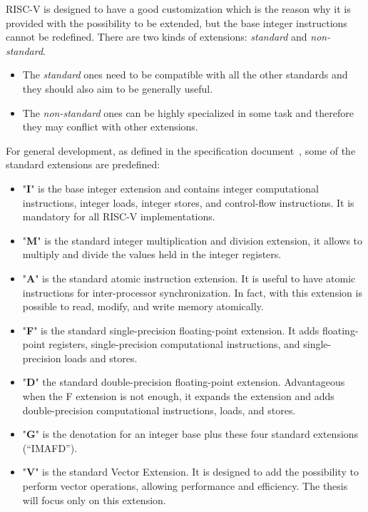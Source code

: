 RISC-V is designed to have a good customization which is the reason why it is provided with the possibility to be extended, but the base integer instructions cannot be redeﬁned.
There are two kinds of extensions:
\textit{standard} and \textit{non-standard}.
\begin{itemize}
    \item The \textit{standard} ones need to be compatible with all the other standards and they should also aim to be generally useful.
    \item The \textit{non-standard} ones can be highly specialized in some task and therefore they may conflict with other extensions.
\end{itemize}

For general development, as defined in the specification document~\cite{RISC-V-Instruction-Set-Manual}, some of the standard extensions are predefined:
\begin{itemize}
    \item "\textbf{I}" is the base integer extension and contains integer computational instructions, integer loads, integer stores, and control-ﬂow instructions. It is mandatory for all RISC-V implementations.
    
    \item "\textbf{M}" is the standard integer multiplication and division extension, it allows to multiply and divide the values held in the integer registers.
    
    \item "\textbf{A}" is the standard atomic instruction extension. It is useful to have atomic instructions for inter-processor synchronization. In fact, with this extension is possible to read, modify, and write memory atomically. 
    
    \item "\textbf{F}" is the standard single-precision ﬂoating-point extension. It adds ﬂoating-point registers, single-precision computational instructions, and single-precision loads and stores. 
    
    \item "\textbf{D}" the standard double-precision ﬂoating-point extension. Advantageous when the F extension is not enough, it expands the extension and adds double-precision computational instructions, loads, and stores.
    
    \item "\textbf{G}" is the denotation for an integer base plus these four standard extensions (“IMAFD”).
    
    \item "\textbf{V}" is the standard Vector Extension. It is designed to add the possibility to perform vector operations, allowing performance and efficiency. The thesis will focus only on this extension.
\end{itemize}



